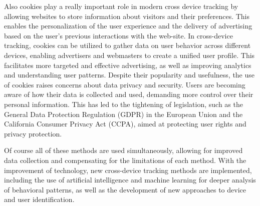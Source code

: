 Also cookies play a really important role in modern cross device tracking by allowing websites to store information about visitors and their preferences. This enables the personalization of the user experience and the delivery of advertising based on the user's previous interactions with the web-site. In cross-device tracking, cookies can be utilized to gather data on user behavior across different devices, enabling advertisers and webmasters to create a unified user profile. This facilitates more targeted and effective advertising, as well as improving analytics and understanding user patterns. Despite their popularity and usefulness, the use of cookies raises concerns about data privacy and security. Users are becoming  aware of how their data is collected and used, demanding more control over their personal information. This has led to the tightening of legislation, such as the General Data Protection Regulation (GDPR) in the European Union and the California Consumer Privacy Act (CCPA), aimed at protecting user rights and privacy protection.\cite{Mitchell2013ThirdPartyCookies}

Of course all of these methods are used simultaneously, allowing for improved data collection and compensating for the limitations of each method. With the improvement of technology, new cross-device tracking methods are implemented, including the use of artificial intelligence and machine learning for deeper analysis of behavioral patterns, as well as the development of new approaches to device and user identification.

